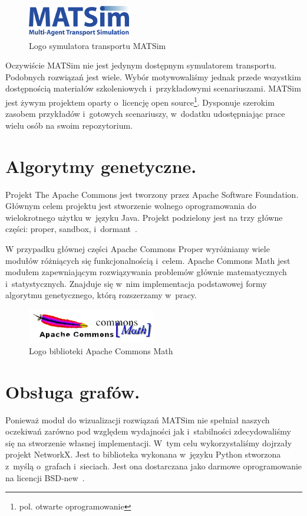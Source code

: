 \documentclass[twoside,12pt]{report}
\begin{document}
\begin{figure}[ht]
\centering
\includegraphics[width=0.40\textwidth]{img/matsim}
\caption{Logo symulatora transportu MATSim} 
\end{figure}

Oczywiście MATSim nie jest jedynym dostępnym symulatorem transportu. Podobnych rozwiązań jest wiele. Wybór motywowaliśmy jednak przede wszystkim dostępnością materiałów szkoleniowych i~przykładowymi scenariuszami. MATSim jest żywym projektem oparty o~licencję open source\footnote{pol. otwarte oprogramowanie}. Dysponuje szerokim zasobem przykładów i~gotowych scenariuszy, w~dodatku udostępniając prace wielu osób na swoim repozytorium.

\section{Algorytmy genetyczne.}

Projekt The Apache Commons jest tworzony przez Apache Software Foundation. Głównym celem projektu jest stworzenie wolnego oprogramowania do wielokrotnego użytku w~języku Java. Projekt podzielony jest na trzy główne części: proper, sandbox, i~dormant~\cite{math}.

W przypadku głównej części Apache Commons Proper wyróżniamy wiele modułów różniących się funkcjonalnością i~celem. Apache Commons Math jest modułem zapewniającym rozwiązywania problemów głównie matematycznych i~statystycznych. Znajduje się w~nim implementacja podstawowej formy algorytmu genetycznego, którą rozszerzamy w~pracy.

\begin{figure}[ht]
\centering
\includegraphics[width=0.50\textwidth]{img/math}
\caption{Logo biblioteki Apache Commons Math} 
\end{figure}

\section{Obsługa grafów.}

Ponieważ moduł do wizualizacji rozwiązań MATSim nie spełniał naszych oczekiwań zarówno pod względem wydajności jak i~stabilności zdecydowaliśmy się na stworzenie własnej implementacji. W~tym celu wykorzystaliśmy dojrzały projekt NetworkX. Jest to biblioteka wykonana w~języku Python stworzona z~myślą o~grafach i~sieciach. Jest ona dostarczana jako darmowe oprogramowanie na licencji BSD-new~\cite{networkx}. 
\end{document}
